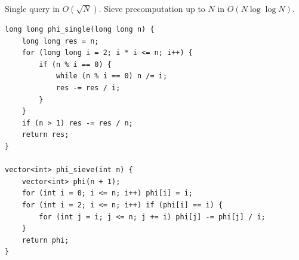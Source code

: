 
Single query in $O(\sqrt{N})$. Sieve precomputation up to $N$ in $O(N \log \log N)$.

\begin{lstlisting}
long long phi_single(long long n) {
    long long res = n;
    for (long long i = 2; i * i <= n; i++) {
        if (n % i == 0) {
            while (n % i == 0) n /= i;
            res -= res / i;
        }
    }
    if (n > 1) res -= res / n;
    return res;
}

vector<int> phi_sieve(int n) {
    vector<int> phi(n + 1);
    for (int i = 0; i <= n; i++) phi[i] = i;
    for (int i = 2; i <= n; i++) if (phi[i] == i) {
        for (int j = i; j <= n; j += i) phi[j] -= phi[j] / i;
    }
    return phi;
}
\end{lstlisting}
